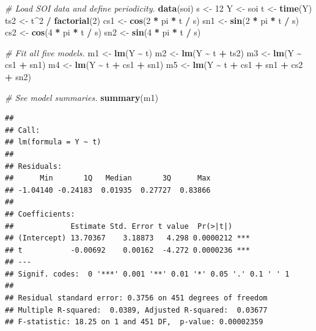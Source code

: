 \documentclass[
  10pt,
]{extarticle}
\newenvironment{Shaded}{\begin{snugshade}}{\end{snugshade}}
\newcommand{\CommentTok}[1]{\textcolor[rgb]{0.56,0.35,0.01}{\textit{#1}}}
\newcommand{\DecValTok}[1]{\textcolor[rgb]{0.00,0.00,0.81}{#1}}
\newcommand{\FunctionTok}[1]{\textcolor[rgb]{0.13,0.29,0.53}{\textbf{#1}}}
\newcommand{\NormalTok}[1]{#1}
\newcommand{\OtherTok}[1]{\textcolor[rgb]{0.56,0.35,0.01}{#1}}
\newcommand{\SpecialCharTok}[1]{\textcolor[rgb]{0.81,0.36,0.00}{\textbf{#1}}}
\begin{document}
\begin{Shaded}
\begin{Highlighting}[]
\CommentTok{\# Load SOI data and define periodicity.}
\FunctionTok{data}\NormalTok{(soi)}
\NormalTok{s }\OtherTok{\textless{}{-}} \DecValTok{12}
\NormalTok{Y }\OtherTok{\textless{}{-}}\NormalTok{ soi}
\NormalTok{t }\OtherTok{\textless{}{-}} \FunctionTok{time}\NormalTok{(Y)}
\NormalTok{ts2 }\OtherTok{\textless{}{-}}\NormalTok{ t}\SpecialCharTok{\^{}}\DecValTok{2} \SpecialCharTok{/} \FunctionTok{factorial}\NormalTok{(}\DecValTok{2}\NormalTok{)}
\NormalTok{cs1 }\OtherTok{\textless{}{-}} \FunctionTok{cos}\NormalTok{(}\DecValTok{2} \SpecialCharTok{*}\NormalTok{ pi }\SpecialCharTok{*}\NormalTok{ t }\SpecialCharTok{/}\NormalTok{ s)}
\NormalTok{sn1 }\OtherTok{\textless{}{-}} \FunctionTok{sin}\NormalTok{(}\DecValTok{2} \SpecialCharTok{*}\NormalTok{ pi }\SpecialCharTok{*}\NormalTok{ t }\SpecialCharTok{/}\NormalTok{ s)}
\NormalTok{cs2 }\OtherTok{\textless{}{-}} \FunctionTok{cos}\NormalTok{(}\DecValTok{4} \SpecialCharTok{*}\NormalTok{ pi }\SpecialCharTok{*}\NormalTok{ t }\SpecialCharTok{/}\NormalTok{ s)}
\NormalTok{sn2 }\OtherTok{\textless{}{-}} \FunctionTok{sin}\NormalTok{(}\DecValTok{4} \SpecialCharTok{*}\NormalTok{ pi }\SpecialCharTok{*}\NormalTok{ t }\SpecialCharTok{/}\NormalTok{ s)}

\CommentTok{\# Fit all five models.}
\NormalTok{m1 }\OtherTok{\textless{}{-}} \FunctionTok{lm}\NormalTok{(Y }\SpecialCharTok{\textasciitilde{}}\NormalTok{ t)}
\NormalTok{m2 }\OtherTok{\textless{}{-}} \FunctionTok{lm}\NormalTok{(Y }\SpecialCharTok{\textasciitilde{}}\NormalTok{ t }\SpecialCharTok{+}\NormalTok{ ts2)}
\NormalTok{m3 }\OtherTok{\textless{}{-}} \FunctionTok{lm}\NormalTok{(Y }\SpecialCharTok{\textasciitilde{}}\NormalTok{ cs1 }\SpecialCharTok{+}\NormalTok{ sn1)}
\NormalTok{m4 }\OtherTok{\textless{}{-}} \FunctionTok{lm}\NormalTok{(Y }\SpecialCharTok{\textasciitilde{}}\NormalTok{ t }\SpecialCharTok{+}\NormalTok{ cs1 }\SpecialCharTok{+}\NormalTok{ sn1)}
\NormalTok{m5 }\OtherTok{\textless{}{-}} \FunctionTok{lm}\NormalTok{(Y }\SpecialCharTok{\textasciitilde{}}\NormalTok{ t }\SpecialCharTok{+}\NormalTok{ cs1 }\SpecialCharTok{+}\NormalTok{ sn1 }\SpecialCharTok{+}\NormalTok{ cs2 }\SpecialCharTok{+}\NormalTok{ sn2)}

\CommentTok{\# See model summaries.}
\FunctionTok{summary}\NormalTok{(m1)}
\end{Highlighting}
\end{Shaded}

\begin{verbatim}
## 
## Call:
## lm(formula = Y ~ t)
## 
## Residuals:
##      Min       1Q   Median       3Q      Max 
## -1.04140 -0.24183  0.01935  0.27727  0.83866 
## 
## Coefficients:
##             Estimate Std. Error t value  Pr(>|t|)    
## (Intercept) 13.70367    3.18873   4.298 0.0000212 ***
## t           -0.00692    0.00162  -4.272 0.0000236 ***
## ---
## Signif. codes:  0 '***' 0.001 '**' 0.01 '*' 0.05 '.' 0.1 ' ' 1
## 
## Residual standard error: 0.3756 on 451 degrees of freedom
## Multiple R-squared:  0.0389, Adjusted R-squared:  0.03677 
## F-statistic: 18.25 on 1 and 451 DF,  p-value: 0.00002359
\end{verbatim}
\end{document}
